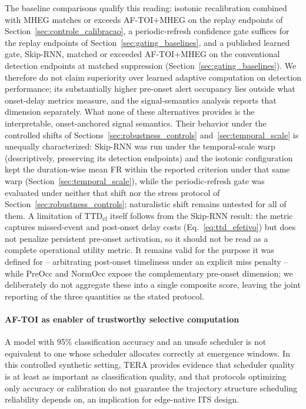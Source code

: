 \documentclass[a4paper,fleqn]{cas-dc}
\newcommand{\MHEG}{\mbox{MHEG}\xspace}
\begin{document}
{\color{\revcolor}The baseline comparisons qualify this reading: isotonic
recalibration combined with \MHEG matches or exceeds \mbox{AF-TOI}+MHEG on
the replay endpoints of Section~\ref{sec:controle_calibracao}, a
periodic-refresh confidence gate suffices for the replay endpoints of
Section~\ref{sec:gating_baselines}, and a published learned gate, Skip-RNN,
matched or exceeded \mbox{AF-TOI}+MHEG on the conventional
detection endpoints at matched suppression
(Section~\ref{sec:gating_baselines}). We therefore do not claim superiority
over learned adaptive computation on detection performance; its
substantially higher pre-onset alert occupancy lies outside what onset-delay
metrics measure, and the signal-semantics analysis reports that dimension
separately. What
none of these alternatives provides is the interpretable, onset-anchored
signal semantics. Their behavior under the controlled shifts of
Sections~\ref{sec:robustness_controls} and~\ref{sec:temporal_scale} is
unequally characterized: Skip-RNN was run under the temporal-scale warp
(descriptively, preserving its detection endpoints) and the isotonic
configuration kept the duration-wise mean FR within the reported criterion
under that same warp (Section~\ref{sec:temporal_scale}), while the
periodic-refresh gate was evaluated under neither that shift nor the stress
protocol of Section~\ref{sec:robustness_controls}; naturalistic shift
remains untested for all of them. A
limitation of $\mathrm{TTD}_{\mathrm{ef}}$ itself follows from the Skip-RNN
result: the metric captures missed-event and post-onset delay costs
(Eq.~\ref{eq:ttd_efetivo}) but does not penalize persistent pre-onset
activation, so it should not be read as a complete operational utility
metric. It remains valid for the purpose it was defined for -- arbitrating
post-onset timeliness under an explicit miss penalty -- while PreOcc and
NormOcc expose the complementary pre-onset dimension; we deliberately do not
aggregate these into a single composite score, leaving the joint reporting of the three quantities as the stated protocol.}
\paragraph{AF-TOI as enabler of trustworthy selective computation}
A model with 95\% classification accuracy and an unsafe scheduler is not
equivalent to one whose scheduler allocates correctly at emergence windows. In
this controlled synthetic setting, TERA provides evidence that scheduler
quality is at least as important as classification quality, and that protocols
optimizing only accuracy or calibration do not guarantee the trajectory
structure scheduling reliability depends on, an implication for edge-native
ITS design.
\end{document}
